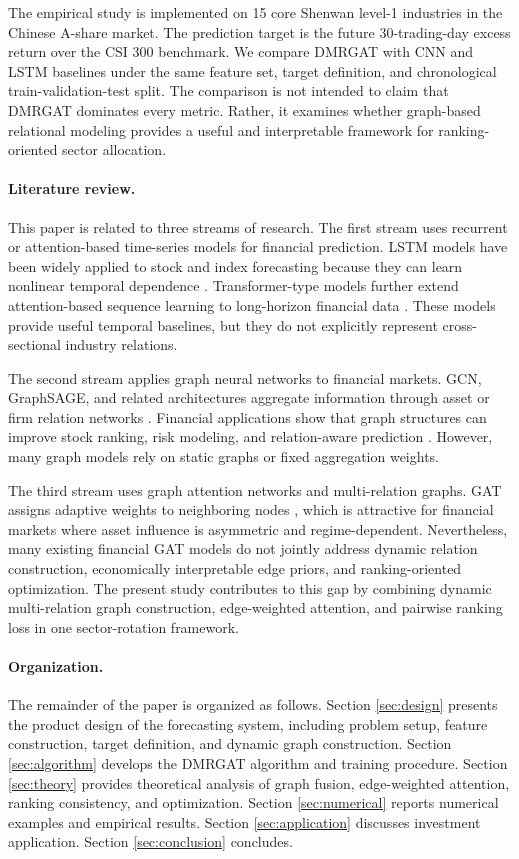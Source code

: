 \documentclass[12pt]{article}
\begin{document}
The empirical study is implemented on 15 core Shenwan level-1 industries in the Chinese A-share market. The prediction target is the future 30-trading-day excess return over the CSI 300 benchmark. We compare DMRGAT with CNN and LSTM baselines under the same feature set, target definition, and chronological train-validation-test split. The comparison is not intended to claim that DMRGAT dominates every metric. Rather, it examines whether graph-based relational modeling provides a useful and interpretable framework for ranking-oriented sector allocation.

\paragraph{Literature review.}
This paper is related to three streams of research. The first stream uses recurrent or attention-based time-series models for financial prediction. LSTM models have been widely applied to stock and index forecasting because they can learn nonlinear temporal dependence \citep{hochreiter1997lstm,fischer2018deep}. Transformer-type models further extend attention-based sequence learning to long-horizon financial data \citep{vaswani2017attention}. These models provide useful temporal baselines, but they do not explicitly represent cross-sectional industry relations.

The second stream applies graph neural networks to financial markets. GCN, GraphSAGE, and related architectures aggregate information through asset or firm relation networks \citep{kipf2017semi,hamilton2017inductive}. Financial applications show that graph structures can improve stock ranking, risk modeling, and relation-aware prediction \citep{feng2019temporal}. However, many graph models rely on static graphs or fixed aggregation weights.

The third stream uses graph attention networks and multi-relation graphs. GAT assigns adaptive weights to neighboring nodes \citep{velickovic2018graph}, which is attractive for financial markets where asset influence is asymmetric and regime-dependent. Nevertheless, many existing financial GAT models do not jointly address dynamic relation construction, economically interpretable edge priors, and ranking-oriented optimization. The present study contributes to this gap by combining dynamic multi-relation graph construction, edge-weighted attention, and pairwise ranking loss in one sector-rotation framework.

\paragraph{Organization.}
The remainder of the paper is organized as follows. Section \ref{sec:design} presents the product design of the forecasting system, including problem setup, feature construction, target definition, and dynamic graph construction. Section \ref{sec:algorithm} develops the DMRGAT algorithm and training procedure. Section \ref{sec:theory} provides theoretical analysis of graph fusion, edge-weighted attention, ranking consistency, and optimization. Section \ref{sec:numerical} reports numerical examples and empirical results. Section \ref{sec:application} discusses investment application. Section \ref{sec:conclusion} concludes.
\end{document}
